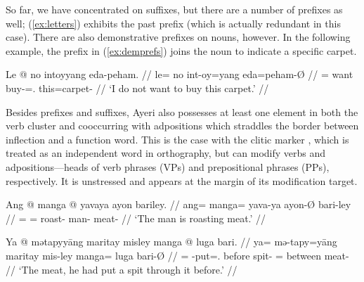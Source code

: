 So far, we have concentrated on suffixes, but there are a number of 
prefixes as well; (\ref{ex:letters}) exhibits the past prefix 
 (which is actually redundant in this case). There are also 
demonstrative prefixes on nouns, however. In the following example, the prefix 
 in (\ref{ex:demprefs}) joins the noun
 to indicate a specific carpet.

\ex\label{ex:demprefs}%
\begingl
	\gla Le @ no intoyyang eda-peham. //
	\glb le= no int-oy=yang eda=peham-Ø //
	\glc \PatTI{}= want buy-\Neg{}=\Fsg{}.\Aarg{} this=carpet-\Top{} //
	\glft `I do not want to buy this carpet.' //
\endgl\xe

Besides prefixes and suffixes, Ayeri also possesses at least one element in
both the verb cluster and cooccurring with adpositions which straddles the
border between inflection and a function word. This is the case with the clitic
marker , which is treated as an independent word in
orthography, but can modify verbs and adpositions---heads of verb phrases (VPs)
and prepositional phrases (PPs), re\-spec\-tive\-ly. It is unstressed and
appears at the margin of its modification target.

\pex
\a\label{ex:prog}\begingl
	\gla Ang @ manga @ yavaya ayon bariley. //
	\glb ang= manga= yava-ya ayon-Ø bari-ley //
	\glc \AgtT{}= \Prog{}= roast-\TsgM{} man-\Top{} meat-\PargI{} //
	\glft `The man is roasting meat.' //
\endgl

\a\label{ex:dyn}\begingl
	\gla Ya @ mətapyyāng maritay misley manga @ luga bari. //
	\glb ya= mə-tapy=yāng maritay mis-ley manga= luga bari-Ø //
	\glc \LocT{}= \Pst{}-put=\TsgM{}.\Aarg{} before spit-\PargI{} \Dir{}= 
		between meat-\Top{} //
	\glft `The meat, he had put a spit through it before.' //
\endgl
\xe

